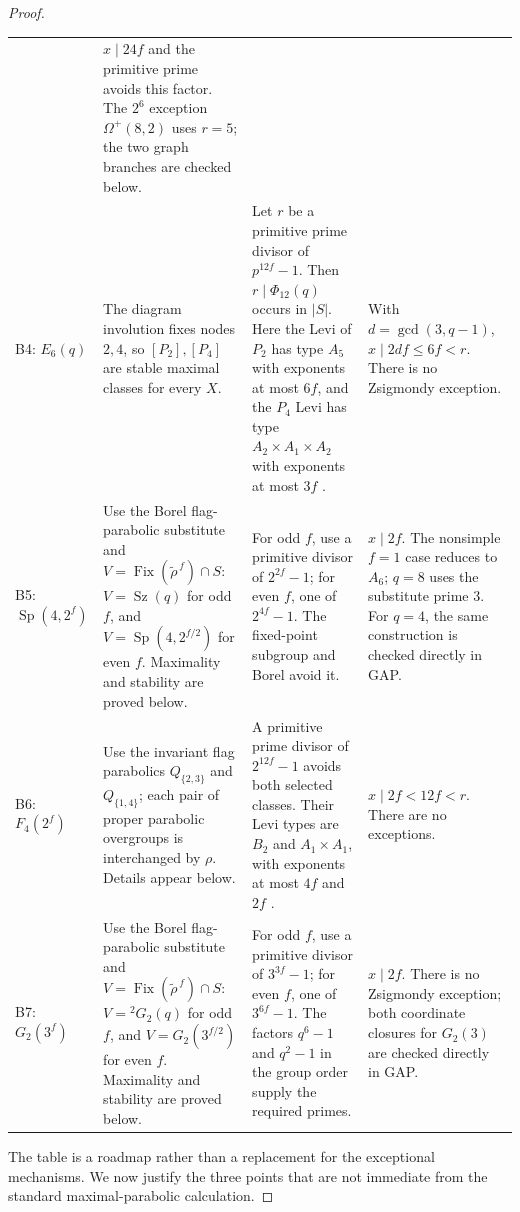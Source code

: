 \documentclass[11pt]{amsart}
\theoremstyle{definition}
\theoremstyle{remark}
\DeclareMathOperator{\Fix}{Fix}
\DeclareMathOperator{\Sp}{Sp}
\DeclareMathOperator{\Sz}{Sz}
\begin{document}
\begin{proof}
\begin{longtable}{@{}L{0.105\textwidth}L{0.295\textwidth}L{0.265\textwidth}L{0.255\textwidth}@{}}
& $x\mid24f$ and the primitive prime avoids this factor. The $2^6$ exception $\Omega^+(8,2)$ uses $r=5$; the two graph branches are checked below.
\\[2pt]
B4: $E_6(q)$
& The diagram involution fixes nodes $2,4$, so $[P_2],[P_4]$ are stable maximal classes for every $X$.
& Let $r$ be a primitive prime divisor of $p^{12f}-1$. Then $r\mid\Phi_{12}(q)$ occurs in $|S|$. Here the Levi of $P_2$ has type $A_5$ with exponents at most $6f$, and the $P_4$ Levi has type $A_2{\times}A_1{\times}A_2$ with exponents at most $3f$ \cite[\S8.5, pp.~118--120]{Carter}.
& With $d=\gcd(3,q-1)$, $x\mid2df\leq6f<r$. There is no Zsigmondy exception.
\\[2pt]
B5: $\Sp(4,2^f)$
& Use the Borel flag-parabolic substitute and $V=\Fix(\widetilde\rho^{\,f})\cap S$: $V=\Sz(q)$ for odd $f$, and $V=\Sp(4,2^{f/2})$ for even $f$. Maximality and stability are proved below.
& For odd $f$, use a primitive divisor of $2^{2f}-1$; for even $f$, one of $2^{4f}-1$. The fixed-point subgroup and Borel avoid it.
& $x\mid2f$. The nonsimple $f=1$ case reduces to $A_6$; $q=8$ uses the substitute prime $3$. For $q=4$, the same construction is checked directly in GAP.
\\[2pt]
B6: $F_4(2^f)$
& Use the invariant flag parabolics $Q_{\{2,3\}}$ and $Q_{\{1,4\}}$; each pair of proper parabolic overgroups is interchanged by $\rho$. Details appear below.
& A primitive prime divisor of $2^{12f}-1$ avoids both selected classes. Their Levi types are $B_2$ and $A_1{\times}A_1$, with exponents at most $4f$ and $2f$ \cite[\S8.5, pp.~118--120]{Carter}.
& $x\mid2f<12f<r$. There are no exceptions.
\\[2pt]
B7: $G_2(3^f)$
& Use the Borel flag-parabolic substitute and $V=\Fix(\widetilde\rho^{\,f})\cap S$: $V={}^2G_2(q)$ for odd $f$, and $V=G_2(3^{f/2})$ for even $f$. Maximality and stability are proved below.
& For odd $f$, use a primitive divisor of $3^{3f}-1$; for even $f$, one of $3^{6f}-1$. The factors $q^6-1$ and $q^2-1$ in the group order supply the required primes.
& $x\mid2f$. There is no Zsigmondy exception; both coordinate closures for $G_2(3)$ are checked directly in GAP.
\\
\end{longtable}
\endgroup

The table is a roadmap rather than a replacement for the exceptional
mechanisms. We now justify the three points that are not immediate from the
standard maximal-parabolic calculation.


\end{proof}
\end{document}
